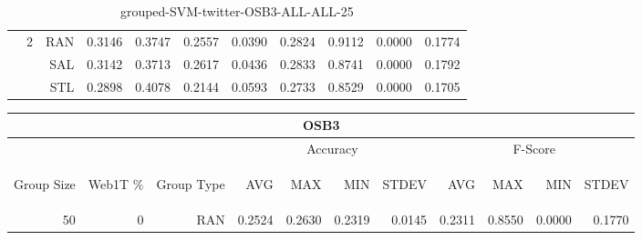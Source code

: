 \begin{center}
\begin{table}[htbp]
\begin{center}
\begin{tabular}{ | r | r | r | r | r | r | r | r | r | r | r |}
 & \multirow{3}{*}{2} & RAN & 0.3146 & 0.3747 & 0.2557 & 0.0390 & 0.2824 & 0.9112 & 0.0000 & 0.1774\\ \cline{3-11}
 &   & SAL & 0.3142 & 0.3713 & 0.2617 & 0.0436 & 0.2833 & 0.8741 & 0.0000 & 0.1792\\ \cline{3-11}
 &   & STL & 0.2898 & 0.4078 & 0.2144 & 0.0593 & 0.2733 & 0.8529 & 0.0000 & 0.1705\\ \cline{2-11}
\hline
\end{tabular}
\caption{grouped-SVM-twitter-OSB3-ALL-ALL-25}
\end{center}
 \end{table}
\end{center}

\begin{center}
\begin{table}[htbp] 
 \begin{center}
\begin{tabular}{ | r | r | r | r | r | r | r | r | r | r | r |}
\hline
\multicolumn{11}{|c|}{OSB3}\\
\hline
 & & & \multicolumn{4}{|c|}{Accuracy} & \multicolumn{4}{|c|}{F-Score}\\ \cline{4-11}
\begin{sideways}Group Size\end{sideways} & \begin{sideways}Web1T \%\end{sideways} & \begin{sideways}Group Type\end{sideways} & \begin{sideways}AVG\end{sideways} & \begin{sideways}MAX\end{sideways} & \begin{sideways}MIN\end{sideways} & \begin{sideways}STDEV\end{sideways} & \begin{sideways}AVG\end{sideways} & \begin{sideways}MAX\end{sideways} & \begin{sideways}MIN\end{sideways} & \begin{sideways}STDEV\end{sideways}\\
\hline
\multirow{6}{*}{50}
 & \multirow{3}{*}{0} & RAN & 0.2524 & 0.2630 & 0.2319 & 0.0145 & 0.2311 & 0.8550 & 0.0000 & 0.1770\\ \cline{3-11}

\end{tabular}
\end{center}
\end{table}
\end{center}
